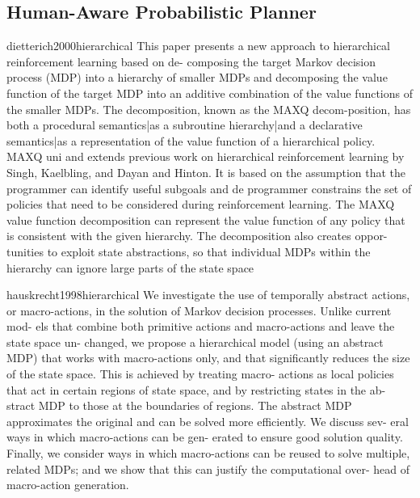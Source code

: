 \subsection{Human-Aware Probabilistic Planner}

dietterich2000hierarchical
This paper presents a new approach to hierarchical reinforcement learning based on de-
composing the target Markov decision process (MDP) into a hierarchy of smaller MDPs
and decomposing the value function of the target MDP into an additive combination of the value functions of the smaller MDPs. The decomposition, known as the MAXQ decom-position, has both a procedural semantics|as a subroutine hierarchy|and a declarative
semantics|as a representation of the value function of a hierarchical policy. MAXQ uni
and extends previous work on hierarchical reinforcement learning by Singh, Kaelbling, and
Dayan and Hinton. It is based on the assumption that the programmer can identify useful
subgoals and de
programmer constrains the set of policies that need to be considered during reinforcement
learning. The MAXQ value function decomposition can represent the value function of any
policy that is consistent with the given hierarchy. The decomposition also creates oppor-
tunities to exploit state abstractions, so that individual MDPs within the hierarchy can
ignore large parts of the state space





hauskrecht1998hierarchical
We investigate the use of temporally abstract
actions, or macro-actions, in the solution of
Markov decision processes. Unlike current mod-
els that combine both primitive actions and
macro-actions and leave the state space un-
changed, we propose a hierarchical model (using
an abstract MDP) that works with macro-actions
only, and that significantly reduces the size of the
state space. This is achieved by treating macro-
actions as local policies that act in certain regions
of state space, and by restricting states in the ab-
stract MDP to those at the boundaries of regions.
The abstract MDP approximates the original and
can be solved more efficiently. We discuss sev-
eral ways in which macro-actions can be gen-
erated to ensure good solution quality. Finally,
we consider ways in which macro-actions can be
reused to solve multiple, related MDPs; and we
show that this can justify the computational over-
head of macro-action generation.



